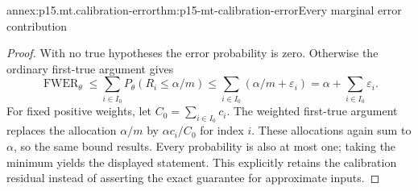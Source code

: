 \begin{annexitem}{annex:p15.mt.calibration-error}{thm:p15-mt-calibration-error}{Every marginal error contribution}
\begin{proof}
With no true hypotheses the error probability is zero.
Otherwise the ordinary first-true argument gives
\[
 \operatorname{FWER}_\theta
 \leq\sum_{i\in I_0}P_\theta(R_i\leq\alpha/m)
 \leq\sum_{i\in I_0}(\alpha/m+\varepsilon_i)
 =\alpha+\sum_{i\in I_0}\varepsilon_i.
\]
For fixed positive weights, let \(C_0=\sum_{i\in I_0}c_i\).
The weighted first-true argument replaces the allocation \(\alpha/m\)
by \(\alpha c_i/C_0\) for index \(i\). These allocations again sum
to \(\alpha\), so the same bound results.
Every probability is also at most one; taking the minimum yields
the displayed statement. This explicitly retains the calibration
residual instead of asserting the exact guarantee for approximate inputs.
\end{proof}
\end{annexitem}
